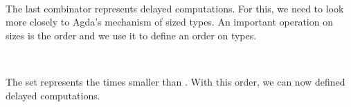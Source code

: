 \begin{code}%
\>[0]\AgdaSpace{}%
\AgdaSymbol{:}\AgdaSpace{}%
\AgdaSymbol{(}\AgdaSpace{}%
\AgdaSpace{}%
\AgdaSpace{}%
\AgdaSpace{}%
\AgdaSymbol{)}\<%
\\
\>[0]\AgdaSpace{}%
\AgdaSpace{}%
\AgdaSpace{}%
\AgdaSymbol{=}\AgdaSpace{}%
\AgdaSpace{}%
\AgdaSpace{}%
\<%
\end{code}

The last combinator represents delayed computations.
For this, we need to look more closely to Agda's mechanism of sized types.
An important operation on sizes is the order and we use it to define an order on types.

\begin{code}%
\>[0]\AgdaSpace{}%
\AgdaSymbol{:}\AgdaSpace{}%
\AgdaSpace{}%
\AgdaSpace{}%
\<%
\\
\>[0]\AgdaSpace{}%
\AgdaSpace{}%
\AgdaSymbol{=}\AgdaSpace{}%
\AgdaSpace{}%
\<%
\end{code}

The set   represents the times smaller than .
With this order, we can now defined delayed computations.

\begin{code}%
\>[0]\AgdaSpace{}%
\AgdaSpace{}%
\AgdaSymbol{(}\AgdaSpace{}%
\AgdaSymbol{:}\AgdaSpace{}%
\AgdaSymbol{)}\AgdaSpace{}%
\AgdaSymbol{(}\AgdaSpace{}%
\AgdaSymbol{:}\AgdaSpace{}%
\AgdaSymbol{)}\AgdaSpace{}%
\AgdaSymbol{:}\AgdaSpace{}%
\AgdaSpace{}%
\<%
\\
\>[0][@{}l@{\AgdaIndent{0}}]%
\>[2]\<%
\\
%
\>[2]\AgdaSpace{}%
\AgdaSpace{}%
\AgdaSymbol{:}\AgdaSpace{}%
\AgdaSymbol{\{}\AgdaSpace{}%
\AgdaSymbol{:}\AgdaSpace{}%
\AgdaSpace{}%
\AgdaSymbol{\}}\AgdaSpace{}%
\AgdaSpace{}%
\AgdaSpace{}%
\<%
\\
\>[0]\AgdaSpace{}%
\AgdaSpace{}%
\<%
\end{code}

